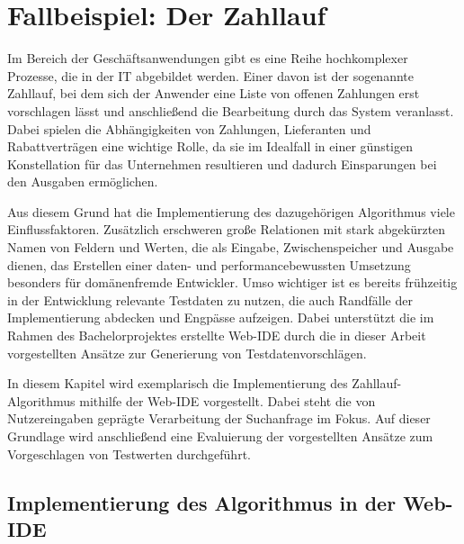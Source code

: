 \section{Fallbeispiel: Der Zahllauf}\label{chap:paymentrun}

Im Bereich der Geschäftsanwendungen gibt es eine Reihe hochkomplexer Prozesse, die in der IT abgebildet werden.
Einer davon ist der sogenannte Zahllauf, bei dem sich der Anwender eine Liste von offenen Zahlungen erst vorschlagen lässt und anschließend die Bearbeitung durch das System veranlasst.
Dabei spielen die Abhängigkeiten von Zahlungen, Lieferanten und Rabattverträgen eine wichtige Rolle, da sie im Idealfall in einer günstigen Konstellation für das Unternehmen resultieren und dadurch Einsparungen bei den Ausgaben ermöglichen.

Aus diesem Grund hat die Implementierung des dazugehörigen Algorithmus viele Einflussfaktoren. 
Zusätzlich erschweren große Relationen mit stark abgekürzten Namen von Feldern und Werten, die als Eingabe, Zwischenspeicher und Ausgabe dienen, das Erstellen einer daten- und performancebewussten Umsetzung besonders für domänenfremde Entwickler.
Umso wichtiger ist es bereits frühzeitig in der Entwicklung relevante Testdaten zu nutzen, die auch Randfälle der Implementierung abdecken und Engpässe aufzeigen.
Dabei unterstützt die im Rahmen des Bachelorprojektes erstellte Web-IDE durch die in dieser Arbeit vorgestellten Ansätze zur Generierung von Testdatenvorschlägen.

In diesem Kapitel wird exemplarisch die Implementierung des Zahllauf-Algorithmus mithilfe der Web-IDE vorgestellt.
Dabei steht die von Nutzereingaben geprägte Verarbeitung der Suchanfrage im Fokus.
Auf dieser Grundlage wird anschließend eine Evaluierung der vorgestellten Ansätze zum Vorgeschlagen von Testwerten durchgeführt.

\subsection{Implementierung des Algorithmus in der Web-IDE}

